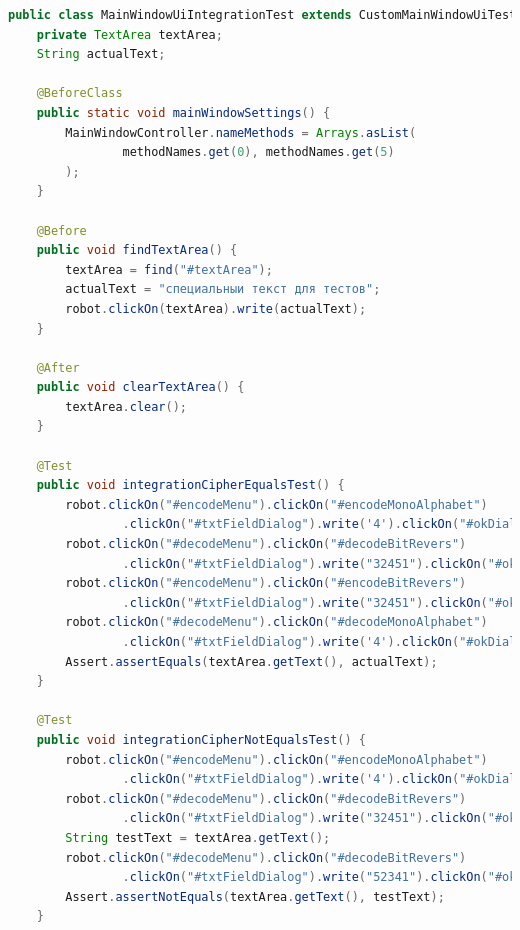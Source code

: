 \documentclass[a4paper,12pt]{article}
\begin{document}
\begin{lstlisting}[language=java, caption=класс MainWindowUiIntegrationTest, label=listing_mainWindow:MainWindowUiIntegrationTestn]
public class MainWindowUiIntegrationTest extends CustomMainWindowUiTest {
    private TextArea textArea;
    String actualText;

    @BeforeClass
    public static void mainWindowSettings() {
        MainWindowController.nameMethods = Arrays.asList(
                methodNames.get(0), methodNames.get(5)
        );
    }

    @Before
    public void findTextArea() {
        textArea = find("#textArea");
        actualText = "специальныи текст для тестов";
        robot.clickOn(textArea).write(actualText);
    }

    @After
    public void clearTextArea() {
        textArea.clear();
    }

    @Test
    public void integrationCipherEqualsTest() {
        robot.clickOn("#encodeMenu").clickOn("#encodeMonoAlphabet")
                .clickOn("#txtFieldDialog").write('4').clickOn("#okDialog");
        robot.clickOn("#decodeMenu").clickOn("#decodeBitRevers")
                .clickOn("#txtFieldDialog").write("32451").clickOn("#okDialog");
        robot.clickOn("#encodeMenu").clickOn("#encodeBitRevers")
                .clickOn("#txtFieldDialog").write("32451").clickOn("#okDialog");
        robot.clickOn("#decodeMenu").clickOn("#decodeMonoAlphabet")
                .clickOn("#txtFieldDialog").write('4').clickOn("#okDialog");
        Assert.assertEquals(textArea.getText(), actualText);
    }

    @Test
    public void integrationCipherNotEqualsTest() {
        robot.clickOn("#encodeMenu").clickOn("#encodeMonoAlphabet")
                .clickOn("#txtFieldDialog").write('4').clickOn("#okDialog");
        robot.clickOn("#decodeMenu").clickOn("#decodeBitRevers")
                .clickOn("#txtFieldDialog").write("32451").clickOn("#okDialog");
        String testText = textArea.getText();
        robot.clickOn("#decodeMenu").clickOn("#decodeBitRevers")
                .clickOn("#txtFieldDialog").write("52341").clickOn("#okDialog");
        Assert.assertNotEquals(textArea.getText(), testText);
    }


\end{lstlisting}
\end{document}
